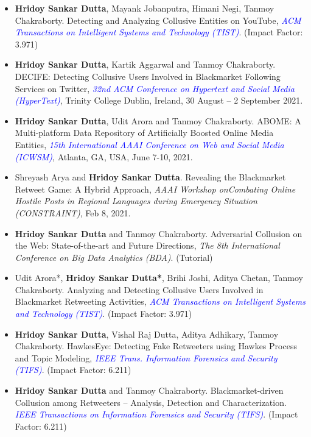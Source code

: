 \documentclass[margin, centered]{res}
\begin{document}
\begin{resume}
\begin{itemize}[leftmargin=*]
\item \textbf{Hridoy Sankar Dutta}, Mayank Jobanputra, Himani Negi, Tanmoy Chakraborty. Detecting and Analyzing Collusive Entities on YouTube,   \textit{\textcolor{blue}{ACM Transactions on Intelligent Systems and Technology (TIST)}}. (Impact Factor: 3.971)

\item \textbf{Hridoy Sankar Dutta}, Kartik Aggarwal and Tanmoy Chakraborty. DECIFE: Detecting Collusive Users Involved in Blackmarket Following Services on Twitter, \textit{\textcolor{blue}{32nd ACM Conference on Hypertext and Social Media (HyperText)}}, Trinity College Dublin, Ireland,  30 August – 2 September 2021.

\item \textbf{Hridoy Sankar Dutta}, Udit Arora and Tanmoy Chakraborty. ABOME: A Multi-platform Data Repository of Artificially Boosted Online Media Entities, \textit{\textcolor{blue}{15th International AAAI Conference on Web and Social Media (ICWSM)}}, Atlanta, GA, USA, June 7-10, 2021.

\item Shreyash Arya and \textbf{Hridoy Sankar Dutta}. Revealing the Blackmarket Retweet Game: A Hybrid Approach, \textit{AAAI Workshop on ​Combating On​line Ho​st​ile Posts in ​Regional L​anguages dur​ing Emerge​ncy Si​tuation (CONSTRAINT)}, Feb 8, 2021.

\item \textbf{Hridoy Sankar Dutta} and Tanmoy Chakraborty. Adversarial Collusion on the Web: State-of-the-art and Future Directions,  \textit{The 8th International Conference on Big Data Analytics (BDA)}. (Tutorial)

\item Udit Arora*, \textbf{Hridoy Sankar Dutta*}, Brihi Joshi, Aditya Chetan, Tanmoy Chakraborty. Analyzing and Detecting Collusive Users Involved in Blackmarket Retweeting Activities,  \textit{\textcolor{blue}{ACM Transactions on Intelligent Systems and Technology (TIST)}}. (Impact Factor: 3.971)

\item \textbf{Hridoy Sankar Dutta}, Vishal Raj Dutta, Aditya Adhikary, Tanmoy Chakraborty. HawkesEye: Detecting Fake Retweeters using Hawkes Process and Topic Modeling,  \textit{\textcolor{blue}{IEEE Trans. Information Forensics and Security (TIFS)}}. (Impact Factor: 6.211)

\item \textbf{Hridoy Sankar Dutta} and Tanmoy Chakraborty. Blackmarket-driven Collusion among Retweeters – Analysis, Detection and Characterization. \textit{\textcolor{blue}{IEEE Transactions on Information Forensics and Security (TIFS)}}. (Impact Factor: 6.211)


\end{itemize}
\end{resume}
\end{document}
